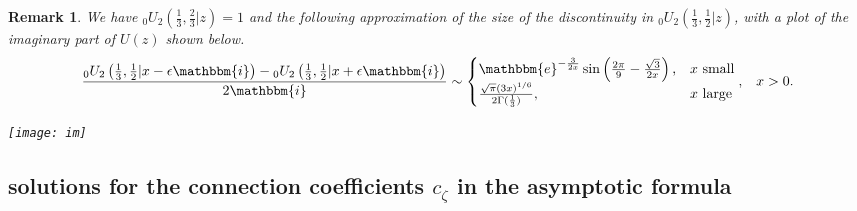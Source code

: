 \documentclass[12pt]{article}
\newcommand{\ee}[0] {\mathbbm{e}}
\newcommand{\ii}[0] {\mathbbm{i}}
\numberwithin{equation}{section}
\newtheorem{remark}[theorem]{Remark}
\newcommand{\FFf}[5] {{}_{#1}{#2}_{#3} \left(#4 | {#5} \right)}
\begin{document}
\begin{remark}
We have $\FFf{0}{U}{2}{\tfrac{1}{3},\tfrac{2}{3}}{z}=1$ and the following approximation of the size of the discontinuity in $\FFf{0}{U}{2}{\tfrac{1}{3},\tfrac{1}{2}}{z}$, with a plot of the imaginary part of $U(z)$ shown below.
\begin{equation*}
\frac{\FFf{0}{U}{2}{\tfrac{1}{3},\tfrac{1}{2}}{x-\epsilon \ii}-\FFf{0}{U}{2}{\tfrac{1}{3},\tfrac{1}{2}}{x+ \epsilon \ii}}{2\ii} \sim \begin{cases}
\ee^{-\frac{3}{2x}} \sin \left(\frac{2 \pi }{9}-\frac{\sqrt{3}}{2 x}\right)\text{,} & x \text{ small}\\
\frac{\sqrt{\pi} (3x)^{1/6}}{2\Gamma(\frac13)} \text{,} & x \text{ large}
\end{cases}\text{,} \quad x > 0.
\end{equation*}
\begin{center}
\texttt{[image: im]}
\end{center}
\end{remark}

\subsection{solutions for the connection coefficients $c_\zeta$ in the asymptotic formula}
\end{document}

